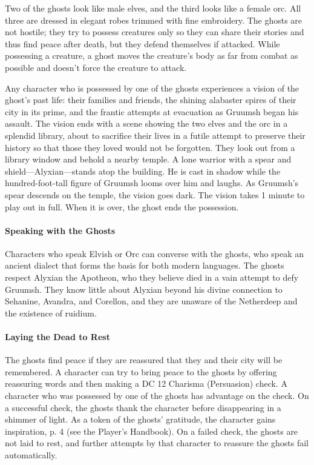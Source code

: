 \documentclass[letterpaper, 11pt, bg=full, twocolumn]{dndbook}
\begin{document}
Two of the ghosts look like male elves, and the third looks like a female orc. All three are dressed in elegant robes trimmed with fine embroidery. The ghosts are not hostile; they try to possess creatures only so they can share their stories and thus find peace after death, but they defend themselves if attacked. While possessing a creature, a ghost moves the creature's body as far from combat as possible and doesn't force the creature to attack.

Any character who is possessed by one of the ghosts experiences a vision of the ghost's past life: their families and friends, the shining alabaster spires of their city in its prime, and the frantic attempts at evacuation as Gruumsh began his assault. The vision ends with a scene showing the two elves and the orc in a splendid library, about to sacrifice their lives in a futile attempt to preserve their history so that those they loved would not be forgotten. They look out from a library window and behold a nearby temple. A lone warrior with a spear and shield---Alyxian---stands atop the building. He is cast in shadow while the hundred-foot-tall figure of Gruumsh looms over him and laughs. As Gruumsh's spear descends on the temple, the vision goes dark. The vision takes 1 minute to play out in full. When it is over, the ghost ends the possession.

\paragraph{Speaking with the Ghosts}

Characters who speak Elvish or Orc can converse with the ghosts, who speak an ancient dialect that forms the basis for both modern languages. The ghosts respect Alyxian the Apotheon, who they believe died in a vain attempt to defy Gruumsh. They know little about Alyxian beyond his divine connection to Sehanine, Avandra, and Corellon, and they are unaware of the Netherdeep and the existence of ruidium.

\paragraph{Laying the Dead to Rest}

The ghosts find peace if they are reassured that they and their city will be remembered. A character can try to bring peace to the ghosts by offering reassuring words and then making a DC 12 Charisma (Persuasion) check. A character who was possessed by one of the ghosts has advantage on the check. On a successful check, the ghosts thank the character before disappearing in a shimmer of light. As a token of the ghosts' gratitude, the character gains inspiration, p. 4 (see the Player's Handbook). On a failed check, the ghosts are not laid to rest, and further attempts by that character to reassure the ghosts fail automatically.
\end{document}
